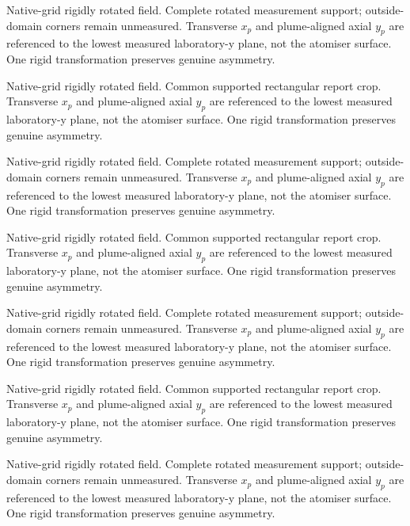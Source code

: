 \caption{Native-grid rigidly rotated field. Complete rotated measurement support; outside-domain corners remain unmeasured. Transverse $x_p$ and plume-aligned axial $y_p$ are referenced to the lowest measured laboratory-y plane, not the atomiser surface. One rigid transformation preserves genuine asymmetry.}

\caption{Native-grid rigidly rotated field. Common supported rectangular report crop. Transverse $x_p$ and plume-aligned axial $y_p$ are referenced to the lowest measured laboratory-y plane, not the atomiser surface. One rigid transformation preserves genuine asymmetry.}

\caption{Native-grid rigidly rotated field. Complete rotated measurement support; outside-domain corners remain unmeasured. Transverse $x_p$ and plume-aligned axial $y_p$ are referenced to the lowest measured laboratory-y plane, not the atomiser surface. One rigid transformation preserves genuine asymmetry.}

\caption{Native-grid rigidly rotated field. Common supported rectangular report crop. Transverse $x_p$ and plume-aligned axial $y_p$ are referenced to the lowest measured laboratory-y plane, not the atomiser surface. One rigid transformation preserves genuine asymmetry.}

\caption{Native-grid rigidly rotated field. Complete rotated measurement support; outside-domain corners remain unmeasured. Transverse $x_p$ and plume-aligned axial $y_p$ are referenced to the lowest measured laboratory-y plane, not the atomiser surface. One rigid transformation preserves genuine asymmetry.}

\caption{Native-grid rigidly rotated field. Common supported rectangular report crop. Transverse $x_p$ and plume-aligned axial $y_p$ are referenced to the lowest measured laboratory-y plane, not the atomiser surface. One rigid transformation preserves genuine asymmetry.}

\caption{Native-grid rigidly rotated field. Complete rotated measurement support; outside-domain corners remain unmeasured. Transverse $x_p$ and plume-aligned axial $y_p$ are referenced to the lowest measured laboratory-y plane, not the atomiser surface. One rigid transformation preserves genuine asymmetry.}

